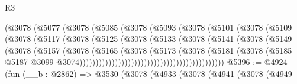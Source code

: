 \begin{lexlean}{R3}
\begin{coremodule}
                                  (@3078
                                    (@5077
                                      (@3078
                                        (@5085
                                          (@3078
                                            (@5093
                                              (@3078
                                                (@5101
                                                  (@3078
                                                    (@5109
                                                      (@3078
                                                        (@5117
                                                          (@3078
                                                            (@5125
                                                              (@3078
                                                                (@5133
                                                                  (@3078
                                                                    (@5141
                                                                      (@3078
                                                                        (@5149
                                                                          (@3078
                                                                            (@5157
                                                                              (@3078
                                                                                (@5165
                                                                                  (@3078
                                                                                    (@5173
                                                                                      (@3078
                                                                                        (@5181
                                                                                          (@3078
                                                                                            (@5185
                                                                                              @5187
                                                                                              @3099
                                                                                              @3074)))))))))))))))))))))))))))))))))))))))))))))
@5396 := @4924
    (fun (__b : @2862) =>
    @3530
      (@3078
        (@4933
          (@3078
            (@4941
              (@3078
                (@4949

\end{coremodule}
\end{lexlean}
